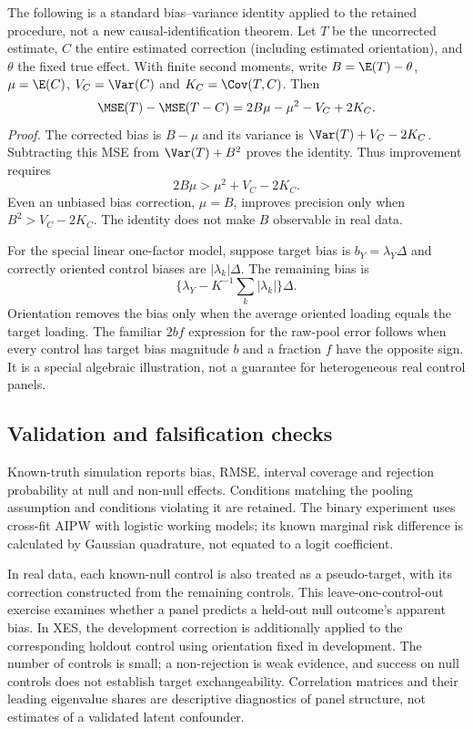 The following is a standard bias--variance identity applied to the retained procedure, not a new causal-identification theorem. Let $T$ be the uncorrected estimate, $C$ the entire estimated correction (including estimated orientation), and $\theta$ the fixed true effect. With finite second moments, write $B=\E(T)-\theta$, $\mu=\E(C)$, $V_C=\Var(C)$ and $K_C=\Cov(T,C)$. Then
\[
\MSE(T)-\MSE(T-C)=2B\mu-\mu^2-V_C+2K_C.
\]
\textit{Proof.} The corrected bias is $B-\mu$ and its variance is $\Var(T)+V_C-2K_C$. Subtracting this MSE from $\Var(T)+B^2$ proves the identity. Thus improvement requires
\[
2B\mu>\mu^2+V_C-2K_C.
\]
Even an unbiased bias correction, $\mu=B$, improves precision only when $B^2>V_C-2K_C$. The identity does not make $B$ observable in real data.

For the special linear one-factor model, suppose target bias is $b_Y=\lambda_Y\Delta$ and correctly oriented control biases are $|\lambda_k|\Delta$. The remaining bias is
\[
\{\lambda_Y-K^{-1}\sum_k|\lambda_k|\}\Delta.
\]
Orientation removes the bias only when the average oriented loading equals the target loading. The familiar $2bf$ expression for the raw-pool error follows when every control has target bias magnitude $b$ and a fraction $f$ have the opposite sign. It is a special algebraic illustration, not a guarantee for heterogeneous real control panels.

\subsection{Validation and falsification checks}

Known-truth simulation reports bias, RMSE, interval coverage and rejection probability at null and non-null effects. Conditions matching the pooling assumption and conditions violating it are retained. The binary experiment uses cross-fit AIPW with logistic working models; its known marginal risk difference is calculated by Gaussian quadrature, not equated to a logit coefficient.

In real data, each known-null control is also treated as a pseudo-target, with its correction constructed from the remaining controls. This leave-one-control-out exercise examines whether a panel predicts a held-out null outcome's apparent bias. In XES, the development correction is additionally applied to the corresponding holdout control using orientation fixed in development. The number of controls is small; a non-rejection is weak evidence, and success on null controls does not establish target exchangeability. Correlation matrices and their leading eigenvalue shares are descriptive diagnostics of panel structure, not estimates of a validated latent confounder.

